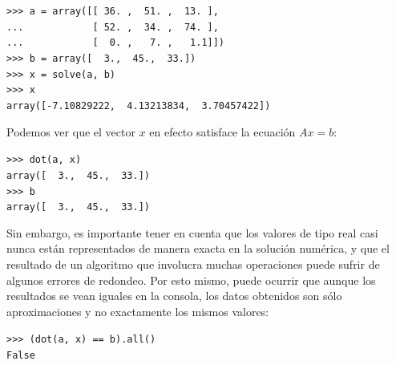 \begin{frame}[fragile]
\fontsize{12}{12}\selectfont
\begin{exampleblock}{}
\verb|>>> a = array([[ 36. ,  51. ,  13. ],| \\
\verb|...            [ 52. ,  34. ,  74. ],| \\
\verb|...            [  0. ,   7. ,   1.1]])| \\
\pause
\verb|>>> b = array([  3.,  45.,  33.])| \\
\pause
\verb|>>> x = solve(a, b)| \\
\pause
\verb|>>> x| \\
\pause
\verb|array([-7.10829222,  4.13213834,  3.70457422])|
\end{exampleblock}
Podemos ver que el vector $x$ en efecto satisface la ecuación $Ax = b$:
\begin{exampleblock}{}
\verb|>>> dot(a, x)| \\
\pause
\verb|array([  3.,  45.,  33.])| \\
\pause
\verb|>>> b| \\
\pause
\verb|array([  3.,  45.,  33.])|
\end{exampleblock}
\end{frame}
\begin{frame}[fragile]
Sin embargo, es importante tener en cuenta que los valores de tipo real casi nunca están representados de manera exacta en la solución numérica, y que el resultado de un algoritmo que involucra muchas operaciones puede sufrir de algunos errores de redondeo. Por esto mismo, puede ocurrir que aunque los resultados se vean iguales en la consola, los datos obtenidos son sólo aproximaciones y no exactamente los mismos valores:
\begin{exampleblock}{}
\verb|>>> (dot(a, x) == b).all()| \\
\pause
\verb|False|
\end{exampleblock}
\end{frame}
